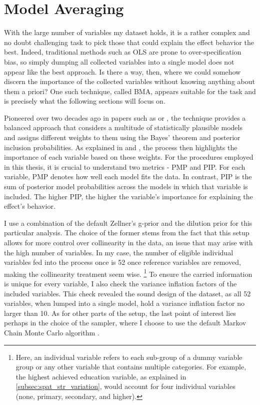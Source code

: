 \section{Model Averaging}
\label{sec:bma}

With the large number of variables my dataset holds, it is a rather complex and no doubt challenging task to pick those that could explain the effect behavior the best. Indeed, traditional methods such as \ac{OLS} are prone to over-specification bias, so simply dumping all collected variables into a single model does not appear like the best approach. Is there a way, then, where we could somehow discern the importance of the collected variables without knowing anything about them a priori? One such technique, called \ac{BMA}, appears suitable for the task and is precisely what the following sections will focus on.

Pioneered over two decades ago in papers such as \cite{hoeting1999bayesian} or \cite{raftery1997bayesian}, the technique provides a balanced approach that considers a multitude of statistically plausible models and assigns different weights to them using the Bayes' theorem and posterior inclusion probabilities. As explained in \cite{hoeting1999bayesian} and \cite{amini2011bayesian}, the process then highlights the importance of each variable based on these weights. For the procedures employed in this thesis, it is crucial to understand two metrics - \ac{PMP} and \ac{PIP}. For each variable, \ac{PMP} denotes how well each model fits the data. In contrast, \ac{PIP} is the sum of posterior model probabilities across the models in which that variable is included. The higher \ac{PIP}, the higher the variable's importance for explaining the effect's behavior.

I use a combination of the default Zellner's g-prior and the dilution prior for this particular analysis. The choice of the former stems from the fact that this setup allows for more control over collinearity in the data, an issue that may arise with the high number of variables. In my case, the number of eligible individual variables fed into the process once is 52 once reference variables are removed, making the collinearity treatment seem wise. \footnote{Here, an individual variable refers to each sub-group of a dummy variable group or any other variable that contains multiple categories. For example, the highest achieved education variable, as explained in \autoref{subsec:spat_str_variation}, would account for four individual variables (none, primary, secondary, and higher).} To ensure the carried information is unique for every variable, I also check the variance inflation factors of the included variables. This check revealed the sound design of the dataset, as all 52 variables, when lumped into a single model, hold a variance inflation factor no larger than 10. As for other parts of the setup, the last point of interest lies perhaps in the choice of the sampler, where I choose to use the default Markov Chain Monte Carlo algorithm \citep{zeugner2015bayesian}.

